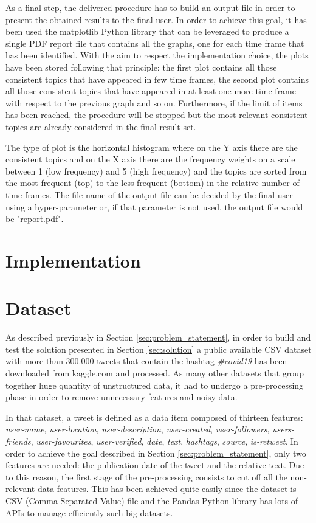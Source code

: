 As a final step, the delivered procedure has to build an output file in order to present the obtained results to the final user. In order to achieve this goal, it has been used the matplotlib Python library \cite{matplotlib-python} that can be leveraged to produce a single PDF report file that contains all the graphs, one for each time frame that has been identified. With the aim to respect the implementation choice, the plots have been stored following that principle: the first plot contains all those consistent topics that have appeared in few time frames, the second plot contains all those consistent topics that have appeared in at least one more time frame with respect to the previous graph and so on. Furthermore, if the limit of items has been reached, the procedure will be stopped but the most relevant consistent topics are already considered in the final result set.

\noindent The type of plot is the horizontal histogram where on the Y axis there are the consistent topics and on the X axis there are the frequency weights on a scale between 1 (low frequency) and 5 (high frequency) and the topics are sorted from the most frequent (top) to the less frequent (bottom) in the relative number of time frames. The file name of the output file can be decided by the final user using a hyper-parameter or, if that parameter is not used, the output file would be "report.pdf".

\section{Implementation}
\label{sec:implementation}


\section{Dataset}
\label{sec:dataset}
As described previously in Section \ref{sec:problem_statement}, in order to build and test the solution presented in Section \ref{sec:solution} a public available CSV dataset with more than 300.000 tweets that contain the hashtag \textit{\#covid19} \cite{covid19-tweets-dataset} has been downloaded from kaggle.com and processed. As many other datasets that group together huge quantity of unstructured data, it had to undergo a pre-processing phase in order to remove unnecessary features and noisy data. 

In that dataset, a tweet is defined as a data item composed of thirteen features: \textit{user-name}, \textit{user-location}, \textit{user-description}, \textit{user-created}, \textit{user-followers}, \textit{users-friends}, \textit{user-favourites}, \textit{user-verified}, \textit{date}, \textit{text}, \textit{hashtags}, \textit{source}, \textit{is-retweet}. In order to achieve the goal described in Section \ref{sec:problem_statement}, only two features are needed: the publication date of the tweet and the relative text. Due to this reason, the first stage of the pre-processing consists to cut off all the non-relevant data features. This has been achieved quite easily since the dataset is CSV (Comma Separated Value) file and the Pandas Python library \cite{python-pandas} has lots of APIs to manage efficiently such big datasets.

